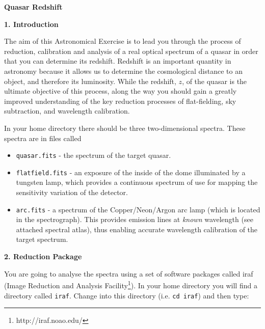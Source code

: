 \pagestyle{myheadings}
\setcounter{page}{1}

\begin{center}
{\Huge\bf Quasar Redshift}
\end{center}

\vspace{0.3cm}

{\large {\bf 1. Introduction}}

The aim of this Astronomical Exercise is to lead you through the process of reduction, calibration and analysis of a real optical spectrum of a quasar in order that you can determine its redshift. Redshift is an important quantity in astronomy because it allows us to determine the cosmological distance to an object, and therefore its luminosity. While the redshift, $z$, of the quasar is the ultimate objective of this process, along the way you should gain a greatly improved understanding of the key reduction processes of flat-fielding, sky subtraction, and wavelength calibration.

In your home directory there should be three two-dimensional spectra. These spectra are in files called
\begin{itemize}

\item{{\tt quasar.fits} - the spectrum of the target quasar.}

\item{{\tt flatfield.fits} - an exposure of the inside of the dome illuminated by a tungsten lamp, which provides a continuous spectrum of use for mapping the sensitivity variation of the detector.} %

\item{{\tt arc.fits} - a spectrum of the Copper/Neon/Argon arc lamp (which is located in the spectrograph). This provides emission lines at {\em known} wavelength (see attached spectral atlas), thus enabling accurate wavelength calibration of the target spectrum.}

\end{itemize}

{\large {\bf 2. Reduction Package}}

You are going to analyse the spectra using a set of software packages called {\sc iraf} (Image Reduction and Analysis Facility\footnote{http://iraf.noao.edu/}). In your home directory you will find a directory called {\tt iraf}. Change into this directory (i.e. {\tt cd iraf}) and then type:

